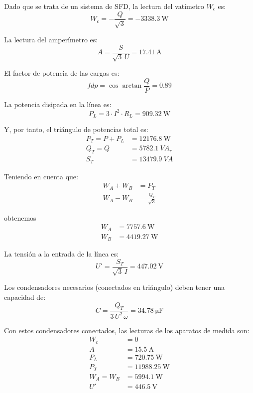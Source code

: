 Dado que se trata de un sistema de SFD, la lectura del vatímetro $W_c$
es:
\begin{equation*}
  W_c = - \frac{Q}{\sqrt{3}} = \SI{-3338.3}{\watt}
\end{equation*}

La lectura del amperímetro es:
\begin{equation*}
  A = \frac{S}{\sqrt{3} \,U} = \SI{17.41}{\ampere}
\end{equation*}

El factor de potencia de las cargas es:
\begin{equation*}
  fdp = \cos{\arctan{\frac{Q}{P}}} = 0.89
\end{equation*}

La potencia disipada en la línea es:
\begin{equation*}
  P_L = 3 \cdot I^2 \cdot R_L = \SI{909.32}{\watt}
\end{equation*}

Y, por tanto, el triángulo de potencias total es:
\begin{align*}
  P_T = P + P_L &= \SI{12176.8}{\watt}\\
  Q_T = Q &= \SI{5782.1}{VA}_r\\
  S_T &= \SI{13479.9}{VA}
\end{align*}

Teniendo en cuenta que:
\begin{align*}
  W_A + W_B &= P_T\\
  W_A - W_B &= \frac{Q_T}{\sqrt{3}}
\end{align*}

obtenemos
\begin{align*}
  W_A &= \SI{7757.6}{\watt}\\
  W_B &= \SI{4419.27}{\watt}
\end{align*}

La tensión a la entrada de la línea es:
\begin{equation*}
  U' = \frac{S_T}{\sqrt{3} \,I} = \SI{447.02}{\volt}
\end{equation*}

Los condensadores necesarios (conectados en triángulo) deben tener una
capacidad de:
\begin{equation*}
  C = \frac{Q_T}{3 \,U^2 \,\omega} = \SI{34.78}{\micro\farad}
\end{equation*}

Con estos condensadores conectados, las lecturas de los aparatos de
medida son:
\begin{align*}
  W_c &= 0\\
  A &= \SI{15.5}{\ampere}\\
  P_L &= \SI{720.75}{\watt}\\
  P_T &= \SI{11988.25}{\watt}\\
  W_A = W_B &= \SI{5994.1}{\watt}\\
  U' &= \SI{446.5}{\volt}\\  
\end{align*}



